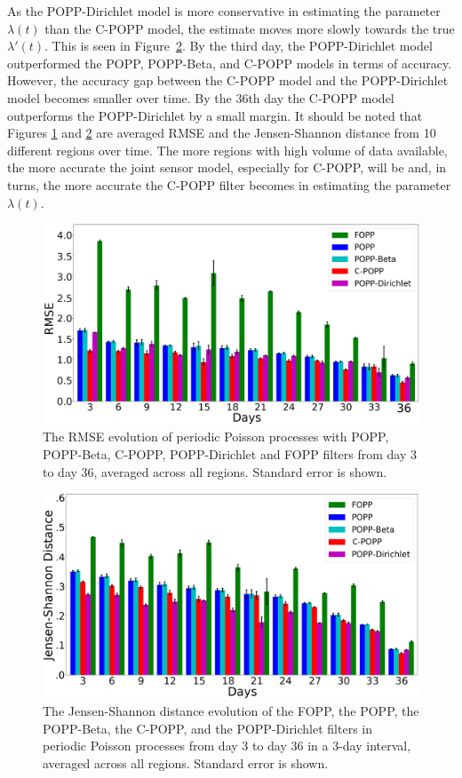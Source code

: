As the POPP-Dirichlet model is more conservative in estimating the parameter $\lambda(t)$ than the C-POPP model, the estimate moves more slowly towards the true $\lambda'(t)$. This is seen in Figure~\ref{fig:fopp_popp_popb_npop_popd_kl_evo}.
By the third day, the POPP-Dirichlet model outperformed the POPP, POPP-Beta, and C-POPP models in terms of accuracy. However, the accuracy gap between the C-POPP model and the POPP-Dirichlet model becomes smaller over time. By the 36th day the C-POPP model outperforms the POPP-Dirichlet by a small margin. It should be noted that Figures \ref{fig:fopp_popp_popb_npop_popd_rmse_evo} and \ref{fig:fopp_popp_popb_npop_popd_kl_evo} are averaged RMSE and the Jensen-Shannon distance from 10 different regions over time. The more regions with high volume of data available, the more accurate the joint sensor model, especially for C-POPP, will be and, in turns, the more accurate the C-POPP filter becomes in estimating the parameter $\lambda(t)$.

\begin{figure}[t!]
	\centering
	\includegraphics[width=0.8\columnwidth]{./figures/fopp_popp_popb_npop_popd_rmse_evo.png}
	\caption{The RMSE evolution of periodic Poisson processes with POPP, POPP-Beta, C-POPP, POPP-Dirichlet and FOPP filters from day 3 to day 36, averaged across all regions. Standard error is shown.}
	\label{fig:fopp_popp_popb_npop_popd_rmse_evo}
	\vspace{-10pt}
\end{figure}

\begin{figure}[t!]
	\centering
	\includegraphics[width=0.8\columnwidth]{./figures/fopp_popp_popb_npop_popd_kl_evo.png}
	\caption{The Jensen-Shannon distance evolution of the FOPP, the POPP, the POPP-Beta, the C-POPP, and the POPP-Dirichlet filters in periodic Poisson processes from day 3 to day 36 in a 3-day interval, averaged across all regions. Standard error is shown.}
	\label{fig:fopp_popp_popb_npop_popd_kl_evo}
	\vspace{-25pt}
\end{figure}

